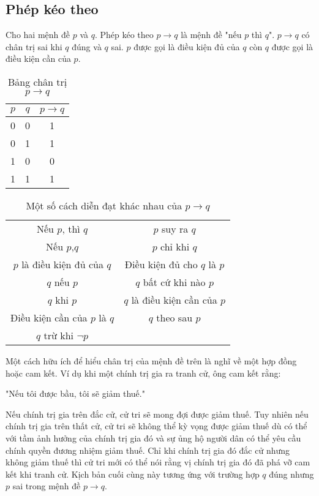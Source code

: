 \documentclass{standalone} %
\begin{document}
    \subsection{Phép kéo theo} 
        \begin{definition}
            Cho hai mệnh đề $p$ và $q$. Phép kéo theo $p \to q$ là mệnh đề "nếu $p$ thì $q$". $p \to q$ có chân trị sai khi $q$ đúng và $q$ sai. $p$ được gọi là điều kiện đủ của $q$ còn $q$ được gọi là điều kiện cần của $p$.
        \end{definition}
        \begin{table}[h!]
            \centering
            \setlength{\tabcolsep}{18pt}
            \begin{tabular}{c c c}
                $p$ & $q$ & $p \to q$ \\ \hline
                0 & 0 & 1\\
                0 & 1 & 1\\ 
                1 & 0 & 0\\
                1 & 1 & 1
            \end{tabular}
            \caption{Bảng chân trị $p \to q$}
        \end{table}
        
        \begin{table}[h!]
            \centering
            \setlength{\tabcolsep}{20pt}
            \caption{Một số cách diễn đạt khác nhau của $p \to q$}
            \begin{tabular}{c|c}
                \hline
                Nếu $p$, thì $q$ & $p$ suy ra $q$\\
                Nếu $p$,$q$ & $p$ chỉ khi $q$ \\
                $p$ là điều kiện đủ của $q$ & Điều kiện đủ cho $q$ là $p$\\
                $q$ nếu $p$ & $q$ bất cứ khi nào $p$\\
                $q$ khi $p$ & $q$ là điều kiện cần của $p$\\
                Điều kiện cần của $p$ là $q$ & $q$ theo sau $p$\\
                $q$ trừ khi $\neg p$ &
            \end{tabular}
        \end{table}
        
        Một cách hữu ích để hiểu chân trị của mệnh đề trên là nghĩ về một hợp đồng hoặc cam kết. Ví dụ khi một chính trị gia ra tranh cử, ông cam kết rằng:
        \begin{center}
            "Nếu tôi được bầu, tôi sẽ giảm thuế."\\
        \end{center}
        Nếu chính trị gia trên đắc cử, cử tri sẽ mong đợi được giảm thuế. Tuy nhiên nếu chính trị gia trên thất cử, cử tri sẽ không thể kỳ vọng được giảm thuế dù có thể với tầm ảnh hưởng của chính trị gia đó và sự ủng hộ người dân có thể yêu cầu chính quyền đương nhiệm giảm thuế. Chỉ khi chính trị gia đó đắc cử nhưng không giảm thuế thì cử tri mới có thể nói rằng vị chính trị gia đó đã phá vỡ cam kết khi tranh cử. Kịch bản cuối cùng này tương ứng với trường hợp $q$ đúng nhưng $p$ sai trong mệnh đề $p \to q$.
        
\end{document}
